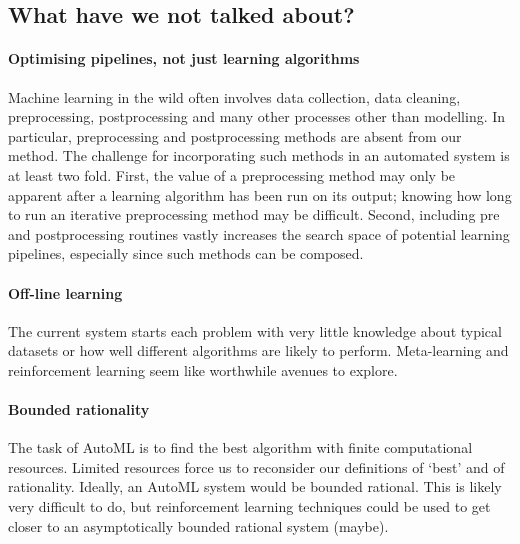 \documentclass{article} %
\begin{document}
\subsection{What have we not talked about?}

\paragraph{Optimising pipelines, not just learning algorithms}

Machine learning in the wild often involves data collection, data cleaning, preprocessing, postprocessing and many other processes other than modelling.
In particular, preprocessing and postprocessing methods are absent from our method.
The challenge for incorporating such methods in an automated system is at least two fold.
First, the value of a preprocessing method may only be apparent after a learning algorithm has been run on its output; knowing how long to run an iterative preprocessing method may be difficult.
Second, including pre and postprocessing routines vastly increases the search space of potential learning pipelines, especially since such methods can be composed.

\paragraph{Off-line learning}

The current system starts each problem with very little knowledge about typical datasets or how well different algorithms are likely to perform.
Meta-learning and reinforcement learning seem like worthwhile avenues to explore.

\paragraph{Bounded rationality}

The task of AutoML is to find the best algorithm with finite computational resources.
Limited resources force us to reconsider our definitions of `best' and of rationality.
Ideally, an AutoML system would be bounded rational.
This is likely very difficult to do, but reinforcement learning techniques could be used to get closer to an asymptotically bounded rational system (maybe).


\small



\end{document}
